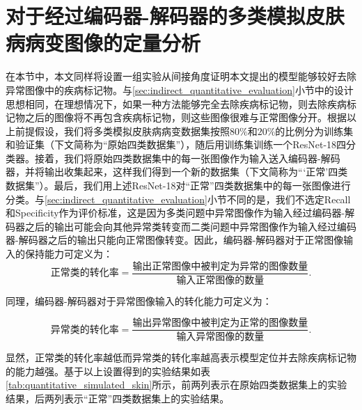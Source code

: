 \section{对于经过编码器-解码器的多类模拟皮肤病病变图像的定量分析}
在本节中，本文同样将设置一组实验从间接角度证明本文提出的模型能够较好去除异常图像中的疾病标记物。与\ref{sec:indirect_quantitative_evaluation}小节中的设计思想相同，在理想情况下，如果一种方法能够完全去除疾病标记物，则去除疾病标记物之后的图像将不再包含疾病标记物，则这些图像很难与正常图像分开。根据以上前提假设，我们将多类模拟皮肤病病变数据集按照$80\%$和$20\%$的比例分为训练集和验证集（下文简称为“原始四类数据集”），随后用训练集训练一个ResNet-18四分类器。接着，我们将原始四类数据集中的每一张图像作为输入送入编码器-解码器，并将输出收集起来，这样我们得到一个新的数据集（下文简称为“‘正常’四类数据集”）。最后，我们用上述ResNet-18对“正常”四类数据集中的每一张图像进行分类。与\ref{sec:indirect_quantitative_evaluation}小节不同的是，我们不选定Recall和Specificity作为评价标准，这是因为多类问题中异常图像作为输入经过编码器-解码器之后的输出可能会向其他异常类转变而二类问题中异常图像作为输入经过编码器-解码器之后的输出只能向正常图像转变。因此，编码器-解码器对于正常图像输入的保持能力可定义为：
\begin{equation}\label{equ:normal_imgs_kep_rate}
\text{正常类的转化率}=\frac{\text{输出正常图像中被判定为异常的图像数量}}{\text{输入正常图像的数量}}.
\end{equation}

\noindent 同理，编码器-解码器对于异常图像输入的转化能力可定义为：

\begin{equation}\label{equ:lesion_imgs_converted_rate}
\text{异常类的转化率}=\frac{\text{输出异常图像中被判定为正常的图像数量}}{\text{输入异常图像的数量}}.
\end{equation}

\noindent 显然，正常类的转化率越低而异常类的转化率越高表示模型定位并去除疾病标记物的能力越强。基于以上设置得到的实验结果如表\ref{tab:quantitative_simulated_skin}所示，前两列表示在原始四类数据集上的实验结果，后两列表示“正常”四类数据集上的实验结果。

